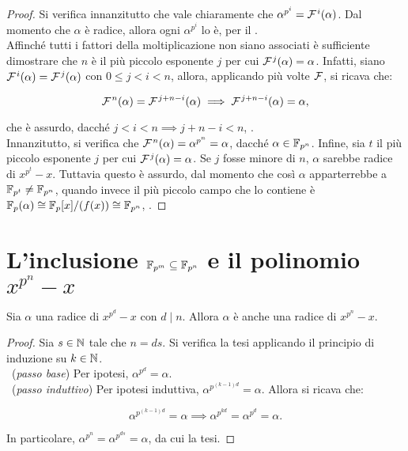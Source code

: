\begin{proof}
    Si verifica innanzitutto che vale chiaramente che $\alpha^{p^i} = \mathcal{F}{\mkern 1.5mu}^i(\alpha)$.
    Dal momento che $\alpha$ è radice, allora ogni $\alpha^{p^i}$ lo è, per il
    . \\

    Affinché tutti i fattori della moltiplicazione non siano associati è sufficiente
    dimostrare che $n$ è il più piccolo esponente $j$ per cui $\mathcal{F}{\mkern 1.5mu}^j(\alpha)=\alpha$.
    Infatti, siano $\mathcal{F}{\mkern 1.5mu}^i(\alpha)=\mathcal{F}{\mkern 1.5mu}^j(\alpha)$ con $0\leq j < i < n$, allora,
    applicando più volte $\mathcal{F}$, si ricava che:

    \[ \mathcal{F}{\mkern 1.5mu}^n(\alpha)=\mathcal{F}{\mkern 1.5mu}^{j+n-i}(\alpha) \implies \mathcal{F}{\mkern 1.5mu}^{j+n-i}(\alpha)=
        \alpha, \]

    \vskip 0.1in

    che è assurdo, dacché $j < i < n \implies j+n-i < n$, \Lightning{}. \\

    Innanzitutto, si verifica che $\mathcal{F}{\mkern 1.5mu}^{n}(\alpha)=\alpha^{p^n}=\alpha$, dacché
    $\alpha \in \mathbb{F}_{p^n}$. Infine, sia $t$ il più piccolo esponente $j$ per cui
    $\mathcal{F}{\mkern 1.5mu}^j(\alpha)=\alpha$. Se $j$ fosse minore di $n$, $\alpha$ sarebbe
    radice di $x^{p^t}-x$. Tuttavia questo è assurdo, dal momento che così
    $\alpha$ apparterrebbe a $\mathbb{F}_{p^{t}} \neq \mathbb{F}_{p^n}$, quando invece il più
    piccolo campo che lo contiene è $\mathbb{F}_p(\alpha) \cong \mathbb{F}_p[x]/(f(x)) \cong \mathbb{F}_{p^n}$,
    \Lightning{}.
\end{proof}

\section{L'inclusione \texorpdfstring{$\mathbb{F}_{p^m} \subseteq \mathbb{F}_{p^n}$}{F\_(p\string^m) in F\_(p\string^n)} e il polinomio \texorpdfstring{$x^{p^n}-x$}{x\string^(p\string^n)-x}}

\begin{lemma}
    \label{lem:alpha_radice}
    Sia $\alpha$ una radice di $x^{p^d}-x$ con $d \mid n$. Allora
    $\alpha$ è anche una radice di $x^{p^n}-x$.
\end{lemma}

\begin{proof} Sia $s \in \mathbb N$ tale che $n=ds$.
    Si verifica la tesi applicando il principio di induzione su $k \in \mathbb N$. \\

    \ (\textit{passo base})\; Per ipotesi, $\alpha^{p^d}=\alpha$. \\

    \ (\textit{passo induttivo})\; Per ipotesi induttiva, $\alpha^{p^{(k-1)d}}=\alpha$. Allora si ricava che:

    \[ \alpha^{p^{(k-1)d}}=\alpha \implies \alpha^{p^{kd}}=\alpha^{p^d}=\alpha. \]

    \vskip 0.1in

    In particolare, $\alpha^{p^n} = \alpha^{p^{ds}} = \alpha$, da cui la tesi.

\end{proof}

